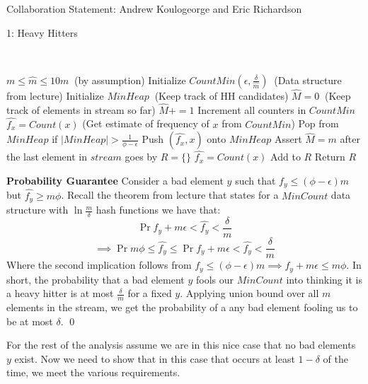 \documentclass[12pt]{article}
\begin{document}

Collaboration Statement: Andrew Koulogeorge and Eric Richardson 

\begin{problem}{1: Heavy Hitters}
\end{problem}

\begin{solution} \ 

\begin{answerbox}
\begin{algorithmic}
\State $m \leq \hat{m} \leq 10m~$ (by assumption)
\State Initialize $CountMin(\epsilon, \frac{\delta}{\hat{m}})~$ (Data structure from lecture)
\State Initialize $MinHeap~$ (Keep track of HH candidates)
\State $\hat{M}=0~$ (Keep track of elements in stream so far)
    \State $\hat{M} += 1$
    \State Increment all counters in $CountMin$
    \State $\hat{f_x} = Count(x)$ (Get estimate of frequency of $x$ from $CountMin$)
      \State Pop from $MinHeap$ if $|MinHeap| > \frac{1}{\phi - \epsilon}$
        \State Push $(\hat{f_x},x)$ onto $MinHeap$ 
    \EndIf
\EndFor
\State Assert $\hat{M} = m$ after the last element in $stream$ goes by
\State $R = \{\}$
    \State $\hat{f_x} = Count(x)$
        \State Add to $R$
    \EndIf
\EndFor
\State Return $R$

\EndProcedure
\end{algorithmic}
\end{answerbox}

\textbf{Probability Guarantee} Consider a bad element $y$ such that $f_y \leq (\phi - \epsilon)m$ but $\hat{f_y} \geq m\phi$. Recall the theorem from lecture that states for a $MinCount$ data structure with $\ln{\frac{m}{\delta}}$ hash functions we have that:
\[
\Pr{f_y + m\epsilon < \hat{f_y}} < \frac{\delta}{m}
\]
\[
\implies \Pr{m\phi \leq \hat{f_y}} \leq \Pr{f_y + m\epsilon < \hat{f_y}} < \frac{\delta}{m}
\]
Where the second implication follows from 
$f_y \leq (\phi - \epsilon)m \implies f_y + m\epsilon \leq m\phi$. In short, the probability that a bad element $y$ fools our $MinCount$ into thinking it is a heavy hitter is at most $\frac{\delta}{m}$ for a fixed $y$. Applying union bound over all $m$ elements in the stream, we get the probability of a any bad element fooling us to be at most $\delta$. \qed

For the rest of the analysis assume we are in this nice case that no bad elements $y$ exist. 
Now we need to show that in this case that occurs at least $1-\delta$ of the time, we meet the various requirements.



\end{solution}
\end{document}
